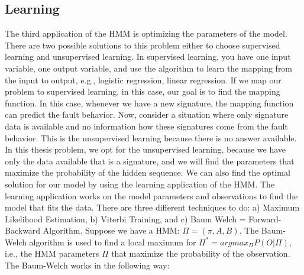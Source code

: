 \subsection{Learning}
The third application of the HMM is optimizing the parameters of the model. There are two possible solutions to this problem either to choose supervised learning and unsupervised learning.  In supervised learning, you have one input variable, one output variable, and use the algorithm to learn the mapping from the input to output, e.g., logistic regression, linear regression. If we  map our problem to supervised learning, in this case, our goal is to find the mapping function. In this case, whenever we have a new signature, the mapping function can predict the fault behavior. Now, consider a situation where only signature data is available and no information how these signatures come from the fault behavior.  This is the unsupervised learning because there is no answer available. In this thesis problem, we opt for the unsupervised learning, because we have only the data available that is a signature, and we will find the parameters that maximize the probability of the hidden sequence.  
We can also find the optimal solution for our model by using the learning application of the HMM. The learning application works on the model parameters and observations to find the model that fits the data. There are three different techniques to do: a) Maximum Likelihood Estimation, b) Viterbi Training, and c) Baum  Welch = Forward-Backward Algorithm. 
Suppose we have a HMM: $\Pi = (\pi, A, B)$. The Baum-Welch algorithm is used to find  a local maximum for $\Pi^* = arg max_{\Pi} P (O | \Pi)$, i.e., the HMM parameters $\Pi$ that maximize the probability of the observation.
The Baum-Welch works in the following way:
